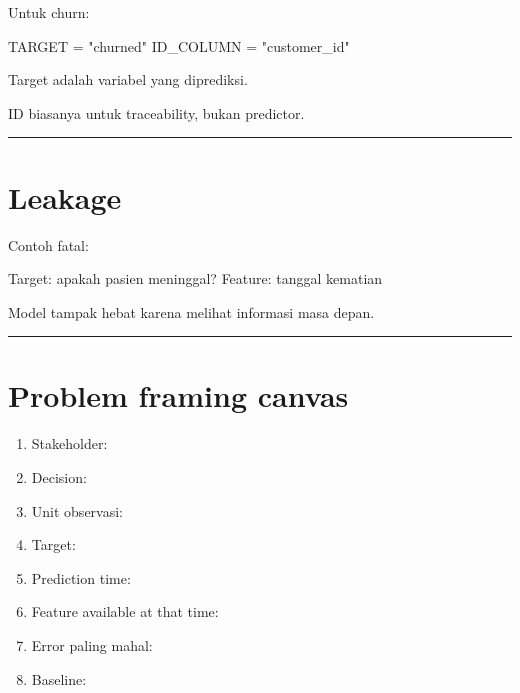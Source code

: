 \documentclass[
  indonesian,
  letterpaper,
  DIV=11,
  numbers=noendperiod]{scrreprt}
\newenvironment{Shaded}{\begin{snugshade}}{\end{snugshade}}
\newcommand{\NormalTok}[1]{\textcolor[rgb]{0.00,0.23,0.31}{#1}}
\newcommand{\OperatorTok}[1]{\textcolor[rgb]{0.37,0.37,0.37}{#1}}
\newcommand{\StringTok}[1]{\textcolor[rgb]{0.13,0.47,0.30}{#1}}
\providecommand{\tightlist}{%
  \setlength{\itemsep}{0pt}\setlength{\parskip}{0pt}}
\begin{document}
Untuk churn:

\begin{Shaded}
\begin{Highlighting}[]
\NormalTok{TARGET }\OperatorTok{=} \StringTok{"churned"}
\NormalTok{ID\_COLUMN }\OperatorTok{=} \StringTok{"customer\_id"}
\end{Highlighting}
\end{Shaded}

Target adalah variabel yang diprediksi.

ID biasanya untuk traceability, bukan predictor.

\begin{center}\rule{0.5\linewidth}{0.5pt}\end{center}

\section{Leakage}\label{leakage}

Contoh fatal:

\begin{Shaded}
\begin{Highlighting}[]
\NormalTok{Target: apakah pasien meninggal?}
\NormalTok{Feature: tanggal kematian}
\end{Highlighting}
\end{Shaded}

Model tampak hebat karena melihat informasi masa depan.

\begin{center}\rule{0.5\linewidth}{0.5pt}\end{center}

\section{Problem framing canvas}\label{problem-framing-canvas}

\begin{enumerate}
\def\labelenumi{\arabic{enumi}.}
\tightlist
\item
  Stakeholder:
\item
  Decision:
\item
  Unit observasi:
\item
  Target:
\item
  Prediction time:
\item
  Feature available at that time:
\item
  Error paling mahal:
\item
  Baseline:
\end{enumerate}
\end{document}
